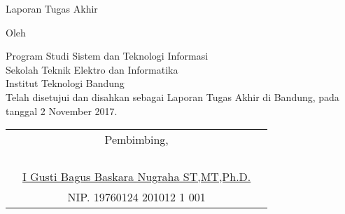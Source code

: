 \clearpage
\pagestyle{empty}

\begin{center}
\smallskip

    \Large \bfseries \MakeUppercase{\thetitle}
    \vfill

    \Large Laporan Tugas Akhir
    \vfill

    \large Oleh

    \Large \theauthor

    \large Program Studi Sistem dan Teknologi Informasi \\
    Sekolah Teknik Elektro dan Informatika \\
    Institut Teknologi Bandung \\

    \vfill
    \normalsize \normalfont
    Telah disetujui dan disahkan sebagai Laporan Tugas Akhir di Bandung, pada tanggal 2 November 2017.

    \vfill
    \setlength{\tabcolsep}{12pt}
    \begin{tabularx}{\textwidth}{c@{\hskip 0.2\textwidth}cc@{\hskip 0.3\textwidth}}
        & Pembimbing, & \\
        & & \\
        & & \\
        & & \\
        & & \\
        & \underline{I Gusti Bagus Baskara Nugraha ST,MT,Ph.D.} & \\
        & NIP. 19760124 201012 1 001 & 
    \end{tabularx}

\end{center}
\clearpage
